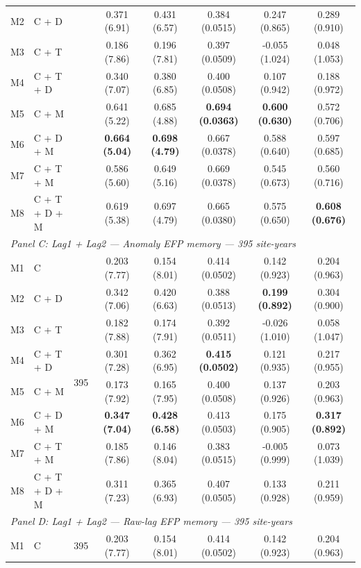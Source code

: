 \begin{table}[htbp]
\begin{tabular}{llcccccc}
M2 & C + D &  & 0.371 (6.91) & 0.431 (6.57) & 0.384 (0.0515) & 0.247 (0.865) & 0.289 (0.910) \\
M3 & C + T &  & 0.186 (7.86) & 0.196 (7.81) & 0.397 (0.0509) & -0.055 (1.024) & 0.048 (1.053) \\
M4 & C + T + D &  & 0.340 (7.07) & 0.380 (6.85) & 0.400 (0.0508) & 0.107 (0.942) & 0.188 (0.972) \\
M5 & C + M &  & 0.641 (5.22) & 0.685 (4.88) & \textbf{0.694 (0.0363)} & \textbf{0.600 (0.630)} & 0.572 (0.706) \\
M6 & C + D + M &  & \textbf{0.664 (5.04)} & \textbf{0.698 (4.79)} & 0.667 (0.0378) & 0.588 (0.640) & 0.597 (0.685) \\
M7 & C + T + M &  & 0.586 (5.60) & 0.649 (5.16) & 0.669 (0.0378) & 0.545 (0.673) & 0.560 (0.716) \\
M8 & C + T + D + M &  & 0.619 (5.38) & 0.697 (4.79) & 0.665 (0.0380) & 0.575 (0.650) & \textbf{0.608 (0.676)} \\
\midrule
\multicolumn{8}{l}{\textit{Panel C: Lag1 + Lag2 --- Anomaly EFP memory --- 395 site-years}} \\
\midrule
M1 & C & \multirow{8}{*}{395} & 0.203 (7.77) & 0.154 (8.01) & 0.414 (0.0502) & 0.142 (0.923) & 0.204 (0.963) \\
M2 & C + D &  & 0.342 (7.06) & 0.420 (6.63) & 0.388 (0.0513) & \textbf{0.199 (0.892)} & 0.304 (0.900) \\
M3 & C + T &  & 0.182 (7.88) & 0.174 (7.91) & 0.392 (0.0511) & -0.026 (1.010) & 0.058 (1.047) \\
M4 & C + T + D &  & 0.301 (7.28) & 0.362 (6.95) & \textbf{0.415 (0.0502)} & 0.121 (0.935) & 0.217 (0.955) \\
M5 & C + M &  & 0.173 (7.92) & 0.165 (7.95) & 0.400 (0.0508) & 0.137 (0.926) & 0.203 (0.963) \\
M6 & C + D + M &  & \textbf{0.347 (7.04)} & \textbf{0.428 (6.58)} & 0.413 (0.0503) & 0.175 (0.905) & \textbf{0.317 (0.892)} \\
M7 & C + T + M &  & 0.185 (7.86) & 0.146 (8.04) & 0.383 (0.0515) & -0.005 (0.999) & 0.073 (1.039) \\
M8 & C + T + D + M &  & 0.311 (7.23) & 0.365 (6.93) & 0.407 (0.0505) & 0.133 (0.928) & 0.211 (0.959) \\
\midrule
\multicolumn{8}{l}{\textit{Panel D: Lag1 + Lag2 --- Raw-lag EFP memory --- 395 site-years}} \\
\midrule
M1 & C & \multirow{8}{*}{395} & 0.203 (7.77) & 0.154 (8.01) & 0.414 (0.0502) & 0.142 (0.923) & 0.204 (0.963) \\

\end{tabular}
\end{table}
